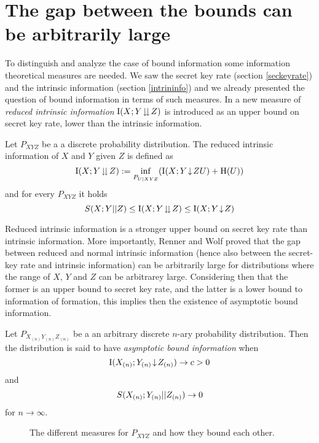 \section{The gap between the bounds can be arbitrarily large}
    To distinguish and analyze the case of bound information some information theoretical measures are needed. 
    We saw the secret key rate (section \ref{seckeyrate}) and the intrinsic information (section \ref{intrininfo}) and we already presented the question of bound information in terms of such measures. 
    In \cite{RW03} a new measure of \emph{reduced intrinsic information} $\operatorname{I}(X;Y\!\downdownarrows\!Z)$ is introduced as an upper bound on secret key rate, lower than the intrinsic information. 
    \begin{definition}\cite{RW03}
    	Let $P_{XYZ}$ be a a discrete probability distribution. The reduced intrinsic information of $X$ and $Y$ given $Z$ is defined as
    	\begin{equation} \label{eq:reducedintrinfo}
    	\operatorname{I}(X;Y\!\downdownarrows\!Z) := \inf_{P_{U|XYZ}} (\operatorname{I}(X;Y\!\downarrow\!ZU) + \operatorname{H} (U))
    \end{equation}
    and for every $P_{XYZ}$ it holds
    \begin{equation} \label{eq:bounds}
    	S(X;Y||Z) \leq \operatorname{I}(X;Y\!\downdownarrows\!Z) \leq \operatorname{I}(X;Y\!\downarrow\!Z)
    \end{equation}
    \end{definition}
    	Reduced intrinsic information is a stronger upper bound on secret key rate than intrinsic information.
    	More importantly, Renner and Wolf proved that the gap between reduced and normal intrinsic information (hence also between the secret-key rate and intrinsic information) can be arbitrarily large for distributions where the range of $X$, $Y$ and $Z$ can be arbitrarey large\cite{RW03}. 
    	Considering then that the former is an upper bound to secret key rate, and the latter is a lower bound to information of formation, this implies then the existence of asymptotic bound information.
    	\begin{definition}\cite{RW03}
    		Let $P_{X_{(n)}Y_{(n)}Z_{(n)}}$ be a an arbitrary discrete $n$-ary probability distribution. Then the distribution is said to have \emph{asymptotic bound information} when
    		\begin{equation}
    			\operatorname{I}(X_{(n)};Y_{(n)}\!\downarrow\!Z_{(n)}) \rightarrow c > 0
    		\end{equation}
    		and
    		\begin{equation}
    			S(X_{(n)};Y_{(n)}||Z_{(n)}) \rightarrow 0
    		\end{equation}
    		for $n\rightarrow \infty$.
    	\end{definition}
    	\begin{figure}
    		
    		\caption{The different measures for $P_{XYZ}$ and how they bound each other.}
    	\end{figure}
    	
